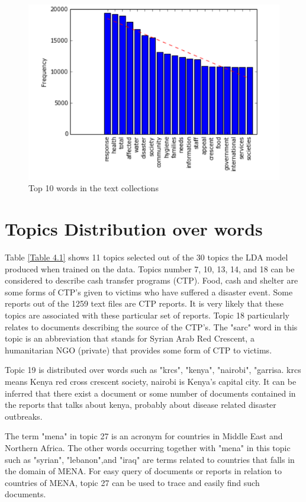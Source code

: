 \begin{figure}[hbtp]
\centering
\includegraphics[scale=0.80]{c4_1.png}
\caption{Top 10 words  in the text collections}\label{Fig. 4.1}
\end{figure}
 
\section{Topics Distribution over words}
Table \eqref{Table 4.1} shows 11 topics selected
out of the 30 topics the LDA model produced when trained on the data. 
Topics number 7, 10, 13, 14, and 18 can be considered to describe cash transfer programs (CTP). Food, cash and shelter are some forms of CTP's given to victims who have suffered  a disaster event. Some  reports out of the 1259 text files are CTP reports. It is very likely that these topics are associated with these particular set of reports. Topic 18 particularly relates to documents describing the source of the CTP's. The "sarc" word in this topic is an abbreviation that stands for Syrian Arab Red Crescent, a humanitarian NGO (private) that provides some form of  CTP to victims.

Topic 19 is distributed over words such as "krcs", "kenya", "nairobi", "garrisa. krcs means Kenya red cross crescent society, nairobi is Kenya's capital city.
It can be inferred that there exist a document or some number of documents contained in the reports that talks about kenya, probably about disease related disaster outbreaks. 

The term "mena" in topic 27 is an acronym for countries in Middle East and Northern Africa. The other words occurring together with "mena" in this topic such as "syrian", "lebanon",and "iraq" are terms related to countries that falls in the domain of MENA. For easy query of documents or reports in relation to countries of MENA, topic 27 can be used to trace and easily find such documents.


